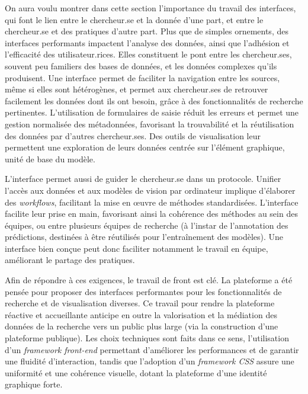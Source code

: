 On aura voulu montrer dans cette section l'importance du travail des
interfaces, qui font le lien entre le chercheur.se et la donnée d'une part,
et entre le chercheur.se et des pratiques d'autre part. Plus que de simples
ornements, des interfaces performants impactent l'analyse des données,
ainsi que l'adhésion et l'efficacité des utilisateur.rices. Elles constituent
le pont entre les chercheur.ses, souvent peu familiers des bases de
données, et les données complexes qu'ils produisent. Une interface
permet de faciliter la navigation entre les sources, même si elles sont
hétérogènes, et permet aux chercheur.ses de retrouver facilement les données
dont ils ont besoin, grâce à des fonctionnalités de recherche
pertinentes. L'utilisation de formulaires de saisie réduit les erreurs
et permet une gestion normalisée des métadonnées, favorisant la
trouvabilité et la réutilisation des données par d'autres chercheur.ses.
Des outils de visualisation leur permettent une exploration de leurs données centrée sur l'élément graphique, unité de base du modèle.

L'interface permet aussi de guider le chercheur.se dans un protocole.
Unifier l'accès aux données et aux modèles de vision par ordinateur
implique d'élaborer des \textit{workflows}, facilitant la mise en œuvre de méthodes standardisées. L'interface facilite leur prise en main,
favorisant ainsi la cohérence des méthodes au sein des
équipes, ou entre plusieurs équipes de recherche (à l'instar de
l'annotation des prédictions, destinées à être réutilisés pour
l'entraînement des modèles). Une interface bien conçue peut donc
faciliter notamment le travail en équipe, améliorant le partage des pratiques.

Afin de répondre à ces exigences, le travail de front est clé. La
plateforme \aikon a été pensée pour proposer des interfaces performantes pour les fonctionnalités de recherche et de visualisation diverses. Ce travail pour rendre
la plateforme réactive et accueillante anticipe en outre la valorisation et la médiation des données de la recherche vers un public plus large (via la construction d'une plateforme
publique). Les choix techniques sont faits dans ce sens, l'utilisation
d'un \textit{framework front-end} permettant d'améliorer les performances et de
garantir une fluidité d'interaction, tandis que l'adoption d'un
\textit{framework CSS} assure une uniformité et une cohérence visuelle, dotant la
plateforme d'une identité graphique forte.